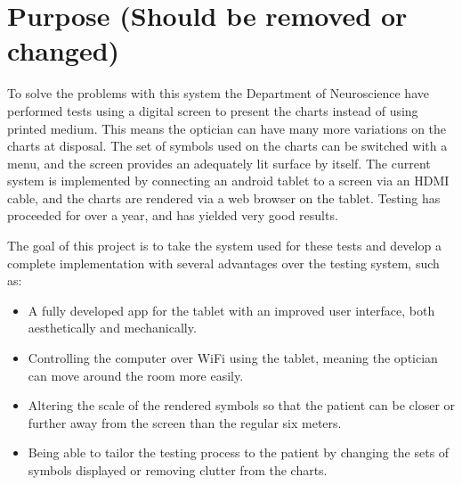 \documentclass[12pt,a4paper,notitlepage]{report}
\begin{document}


\section{Purpose (Should be removed or changed)}
To solve the problems with this system the Department of Neuroscience have performed tests using a digital screen to present the charts instead of using printed medium. This means the optician can have many more variations on the charts at disposal. The set of symbols used on the charts can be switched with a menu, and the screen provides an adequately lit surface by itself. The current system is implemented by connecting an android tablet to a screen via an HDMI cable, and the charts are rendered via a web browser on the tablet. Testing has proceeded for over a year, and has yielded very good results.

The goal of this project is to take the system used for these tests and develop a complete implementation with several advantages over the testing system, such as:

\begin{itemize}
	\item A fully developed app for the tablet with an improved user interface, both aesthetically and mechanically.
	\item Controlling the computer over WiFi using the tablet, meaning the optician can move around the room more easily.
	\item Altering the scale of the rendered symbols so that the patient can be closer or further away from the screen than the regular six meters.
	\item Being able to tailor the testing process to the patient by changing the sets of symbols displayed or removing clutter from the charts.
\end{itemize}
	
\end{document}
